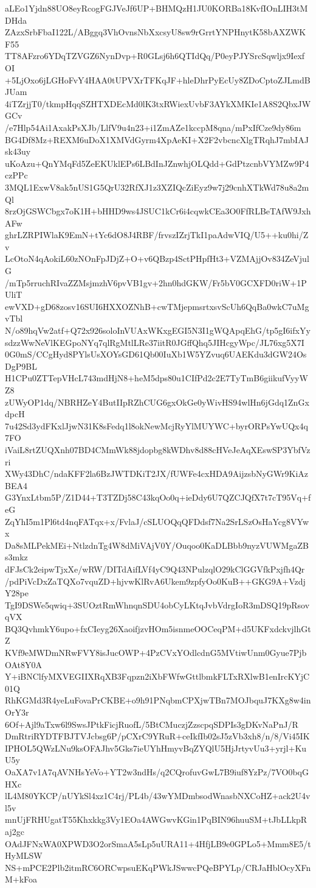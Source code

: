 aLEo1Yjdn88UO8eyRcogFGJVeJf6UP+BHMQzH1JU0KORBa18KvfIOnLIH3tMDHda
ZAzxSrbFbaI122L/ABggq3VhOvnsNbXxcsyU8sw9rGrrtYNPHnytK58bAXZWKF55
TT8AFzro6YDqTZVGZ6NynDvp+R0GLsj6h6QTIdQq/P0eyPJYSrcSqwljx9IexfOI
+5LjOxo6jLGHoFvY4HAA0tUPVXrTFKqJF+hleDhrPyEcUy8ZDoCptoZJLmdBJUam
4iTZrjjT0/tkmpHqqSZHTXDEcMd0lK3txRWiexUvbF3AYkXMKIe1A8S2QbxJWGCv
/e7Hlp54Ai1AxakPsXJb/LlfV9u4n23+i1ZmAZe1kccpM8qna/mPxIfCze9dy86m
BG4Df8Mz+REXM6uDoX1XMVdGyrm4XpAeKI+X2F2vbcncXlgTRqhJ7mbIAJsk43uy
uKoAzu+QnYMqFd5ZeEKUklEPs6LBdInJZnwhjOLQdd+GdPtzcnbVYMZw9P4czPPc
3MQL1ExwV8ak5nUS1G5QrU32RfXJ1z3XZIQcZiEyz9w7j29cnhXTkWd78u8a2mQl
8rzOjGSWCbgx7oK1H+bHHD9ws4JSUC1kCr6i4cqwkCEa3O0FfRLBeTAfW9JxhAFw
ghrLZRPIWlaK9EmN+tYc6dO8J4RBF/frvszIZrjTkI1paAdwVIQ/U5++ku0hi/Zv
LcOtoN4qAokiL60zNOnFpJDjZ+O+v6QBzp4SctPHpfHt3+VZMAjjOv834ZeVjulG
/mTp5rruchRIvaZZMsjmzhV6pvVB1gv+2hn0hdGKW/Fr5bV0GCXFD0riW+1PUliT
ewVXD+gD68zosv16SUI6HXXOZNhB+cwTMjepmsrtxsvScUh6QqBa0wkC7uMgvTbl
N/o89hqVw2atf+Q72x926soloInVUAxWKxgEGI5N3I1gWQApqEhG/tp5gI6ifxYy
sdzzWwNeVlKEGpoNYq7qlRgMtlLRe37iitR0JGffQhq5JIHcgyWpc/JL76xg5X7I
0G0mS/CCgHyd8PYlsUsXOYsGD61Qb00IuXb1W5YZvuq6UAEKdu3dGW24OsDgP9BL
H1CPu0ZTTepVHcL743mdHjN8+heM5dps80u1CIfPd2c2E7TyTmB6giikufVyyWZ8
zUWyOP1dq/NBRHZeY4ButIIpRZhCUG6gxOkGe0yWivHS94wlHn6jGdq1ZnGxdpcH
7u42Sd3ydFKxlJjwN31K8sFedq1l8okNewMcjRyYlMUYWC+byrORPsYwUQx4q7FO
iVaiL8rtZUQXnh07BD4CMmWk88jdopbg8kWDhv8d88cHVeJeAqXEswSP3YbfVzri
XWy43DhC/ndaKFF2la6BzJWTDKiT2JX/fUWFe4cxHDA9AijzsbNyGWr9KiAzBEA4
G3YnxLtbm5P/Z1D44+T3TZDj58C43kqOo0q+ieDdy6U7QZCJQfX7t7cT95Vq+feG
ZqYhI5m1Pl6td4nqFATqx+x/FvlaJ/cSLUOQqQFDdsf7Na2SrLSzOsHaYcg8VYwx
Da8sMLPekMEi+NtlzdnTg4W8dMiVAjV0Y/Ouqoo0KaDLBbb9nyzVUWMgaZBs3mkz
dFJsCk2eipwTjxXe/wRW/DITdAifLVf4yC9Q43NPulzqlO29kClGGVfkPxjfh4Qr
/pdPiVcDxZaTQXo7vquZD+hjvwKlRvA6Ukem9zpfyOo0KuB++GKG9A+VzdjY28pe
TgI9DSWe5qwiq+3SUOztRmWhnqnSDU4obCyLKtqJvbVdrgIoR3mDSQ19pRsovqVX
BQ3QvhmkY6upo+fxCIeyg26XaoifjzvHOm5isnmeOOCeqPM+d5UKFxdckvjlhGtZ
KVf9eMWDmNRwFVY8isJucOWP+4PzCVxYOdlcdnG5MVtiwUnm0Gyue7PjbOAt8Y0A
Y+iBNClfyMXVEGIIXRqXB3Fqpzn2iXbFWfwGttlbmkFLTxRXlwB1enIrcKYjC01Q
RhKGMd3R4yeLuFovaPrCKBE+o9h91PNqbmCPXjwTBn7MOJbquJ7KXg8w4inOrY3r
6Of+Ajl9aTxw6l9SwsJPtkFicjRuofL/5BtCMuczjZzscpqSDPIs3gDKvNaPnJ/R
DmRtriRYDTFBJTVJcbsg6P/pCXrC9YRuR+ceIkfIb02sJ5zVb3xh8/n/8/Vi45IK
IPHOL5QWzLNu9ksOFAJhv5Gks7ieUYhHmyvBqZYQlU5HjJrtyvUu3+yrjl+KuU5y
OaXA7v1A7qAVNHsYeVo+YT2w3ndHs/q2CQrofuvGwL7B9iuf8YzPz/7VO0bqGHXc
lL4M80YKCP/nUYkSl4xz1C4rj/PL4b/43wYMDmbsodWnasbNXCoHZ+ack2U4vl5v
mnUjFRHUgatT55Khxkkg3Vy1EOa4AWGwvKGin1PqBIN96huuSM+tJbLLkpRaj2gc
OAdJFNxWA0XPWD3O2orSmaA5sLp5uURA11+4HfjLB9e0GPLo5+Mmm8E5/tHyMLSW
NS+mPCE2Plb2itmRC6ORCwpsuEKqPWkJSwwcPQeBPYLp/CRJaHblOcyXFnM+kFoa
